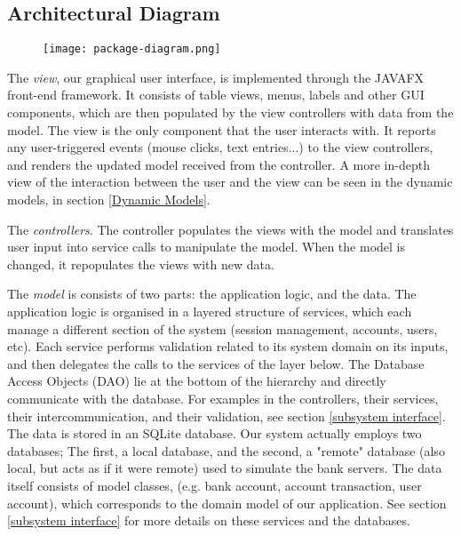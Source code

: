 \documentclass[12pt]{article}
\begin{document}

\subsection{Architectural Diagram}

\begin{figure}[H]
\texttt{[image: package-diagram.png]}
\end{figure}

The \textit{view}, our graphical user interface, is implemented through the JAVAFX front-end framework. It consists of table views, menus, labels and other GUI components, which are then populated by the view controllers with data from the model. The view is the only component that the user interacts with. It reports any user-triggered events (mouse clicks, text entries...) to the view controllers, and renders the updated model received from the controller. A more in-depth view of the interaction between the user and the view can be seen in the dynamic models, in section \ref{Dynamic Models}.

The \textit{controllers}. The controller populates the views with the model and translates user input into service calls to manipulate the model. When the model is changed, it repopulates the views with new data. 

The \textit{model} is consists of two parts: the application logic, and the data. The application logic is organised in a layered structure of services, which each manage a different section of the system (session management, accounts, users, etc).
Each service performs validation related to its system domain on its inputs, and then delegates the calls to the services of the layer below. The Database Access Objects (DAO) lie  at the bottom of the hierarchy and directly communicate with the database. For examples in the controllers, their services, their intercommunication, and their validation, see section \ref{subsystem interface}.
The data is stored in an SQLite database. Our system actually employs two databases; The first, a local database, and the second, a "remote" database (also local, but acts as if it were remote) used to simulate the bank servers. The data itself consists of model classes, (e.g. bank account, account transaction, user account), which corresponds to the domain model of our application. See section \ref{subsystem interface} for more details on these services and the databases.
\end{document}
